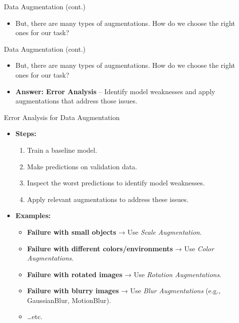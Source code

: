 \begin{frame}{Data Augmentation (cont.)}
\begin{itemize}
    \item But, there are many types of augmentations. How do we choose the right ones for our task?
\end{itemize}
\end{frame}

\begin{frame}{Data Augmentation (cont.)}
\begin{itemize}
    \item But, there are many types of augmentations. How do we choose the right ones for our task?
    \item \textbf{Answer: Error Analysis} – Identify model weaknesses and apply augmentations that address those issues.
\end{itemize}
\end{frame}

\begin{frame}{Error Analysis for Data Augmentation}
\begin{itemize}
    \item \textbf{Steps:}
    \begin{enumerate}
        \item Train a baseline model.
        \item Make predictions on validation data.
        \item Inspect the worst predictions to identify model weaknesses.
        \item Apply relevant augmentations to address these issues.
    \end{enumerate}
    \item \textbf{Examples:}
    \begin{itemize}
        \item \textbf{Failure with small objects} → Use \textit{Scale Augmentation}.
        \item \textbf{Failure with different colors/environments} → Use \textit{Color Augmentations}.
        \item \textbf{Failure with rotated images} → Use \textit{Rotation Augmentations}.
        \item \textbf{Failure with blurry images} → Use \textit{Blur Augmentations} (e.g., GaussianBlur, MotionBlur).
        \item \dots etc.
    \end{itemize}
\end{itemize}
\end{frame}

